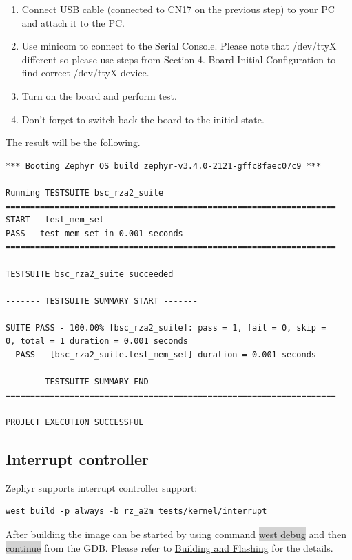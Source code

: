 \documentclass[11pt,a4paper,oneside]{article}
\begin{document}
\begin{enumerate}
\def\labelenumi{\arabic{enumi})}
\setcounter{enumi}{3}
\item
  Connect USB cable (connected to CN17 on the previous step) to your PC
  and attach it to the PC.
\item
  Use minicom to connect to the Serial Console. Please note that
  /dev/ttyX different so please use steps from Section 4. Board Initial
  Configuration to find correct /dev/ttyX device.
\item
  Turn on the board and perform test.
\item
  Don't forget to switch back the board to the initial state.
\end{enumerate}

The result will be the following.

\begin{lstlisting}
*** Booting Zephyr OS build zephyr-v3.4.0-2121-gffc8faec07c9 ***

Running TESTSUITE bsc_rza2_suite
===================================================================
START - test_mem_set
PASS - test_mem_set in 0.001 seconds
===================================================================

TESTSUITE bsc_rza2_suite succeeded

------- TESTSUITE SUMMARY START -------

SUITE PASS - 100.00% [bsc_rza2_suite]: pass = 1, fail = 0, skip =
0, total = 1 duration = 0.001 seconds
- PASS - [bsc_rza2_suite.test_mem_set] duration = 0.001 seconds

------- TESTSUITE SUMMARY END -------
===================================================================

PROJECT EXECUTION SUCCESSFUL
\end{lstlisting}

\subsection{Interrupt controller}\label{interrupt-controller}

Zephyr supports interrupt controller support:

\begin{lstlisting}
west build -p always -b rz_a2m tests/kernel/interrupt
\end{lstlisting}

After building the image can be started by using command \colorbox{lightgray}{west debug}
and then \colorbox{lightgray}{continue} from the GDB. Please refer to
\hyperref[building-and-flashing]{Building and Flashing} for the
details.
\end{document}
